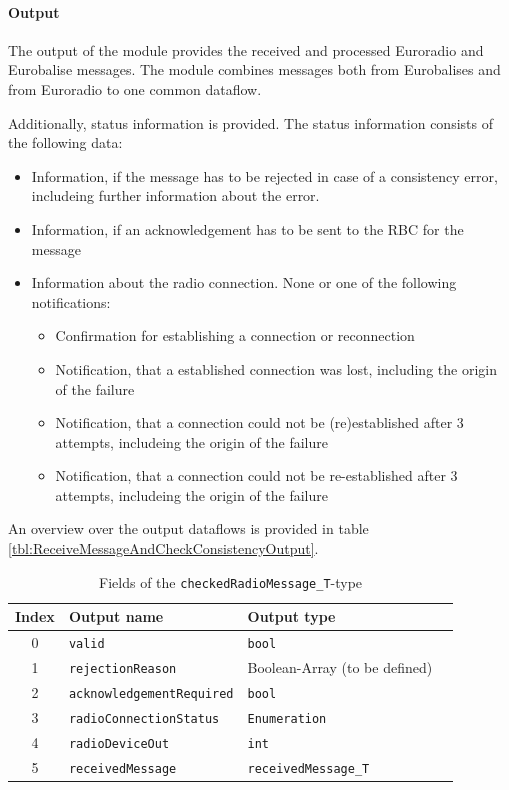 \documentclass{template/openetcs_report}
\begin{document}
\paragraph{Output}

The output of the module provides the received and processed Euroradio and Eurobalise messages. The module combines messages both from Eurobalises and from Euroradio to one common dataflow.

Additionally, status information is provided. The status information consists of the following data:
\begin{itemize}
	\item Information, if the message has to be rejected in case of a consistency error, includeing further information about the error.
	\item Information, if an acknowledgement has to be sent to the RBC for the message
	\item Information about the radio connection. None or one of the following notifications:
	\begin{itemize}
		\item Confirmation for establishing a connection or reconnection
		\item Notification, that a established connection was lost, including the origin of the failure
		\item Notification, that a connection could not be (re)established after 3 attempts, includeing the origin of the failure
		\item Notification, that a connection could not be re-established after 3 attempts, includeing the origin of the failure
	\end{itemize}
\end{itemize}

An overview over the output dataflows is provided in table \ref{tbl:ReceiveMessageAndCheckConsistencyOutput}.

\begin{table}[H]
  \begin{tabular}{| c | l | l | l |}
    \hline
    \textbf{Index} & \textbf{Output name} & \textbf{Output type}\\ \hline
    0 & \texttt{valid} & \texttt{bool}\\
    1 & \texttt{rejectionReason} & Boolean-Array (to be defined)\\
    2 & \texttt{acknowledgementRequired} & \texttt{bool}\\
    3 & \texttt{radioConnectionStatus} & \texttt{Enumeration}\\
    4 & \texttt{radioDeviceOut} & \texttt{int}\\
    5 & \texttt{receivedMessage} & \texttt{receivedMessage\_T} \\
    \hline
  \end{tabular} 
  \caption{Fields of the \texttt{checkedRadioMessage\_T}-type}
  \label{tbl:checkedMessage}
\end{table}
\end{document}

